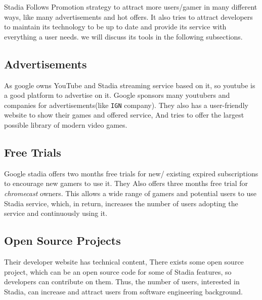 Stadia Follows  Promotion strategy to attract more users/gamer in many different ways,
like many advertisements and hot offers. It also tries to attract developers to maintain its technology to be up to date and provide its service with everything a user needs.
we will discuss its tools in the following subsections.


\subsection{Advertisements}
As google owns YouTube and Stadia streaming service based on it, so youtube is a good platform to advertise on it. Google sponsors many youtubers and companies for advertisements(like \texttt{IGN} company). They also has a user-friendly website to show their games and offered service, And tries to offer the largest possible library of modern video games.

\subsection{Free Trials}
Google stadia offers two months free trials for new/ existing expired subscriptions to encourage new gamers to use it. They Also offers three months free trial for \emph{chromecast} owners. This allows a wide range of gamers and potential users to use Stadia service, which, in return, increases the number of users adopting the service and continuously using it.

\subsection{Open Source Projects}
Their developer website has technical content, There exists some open source project, which can be an open source code for some of Stadia features, so developers can contribute on them. Thus, the number of users, interested in Stadia, can increase and attract users from software engineering background.